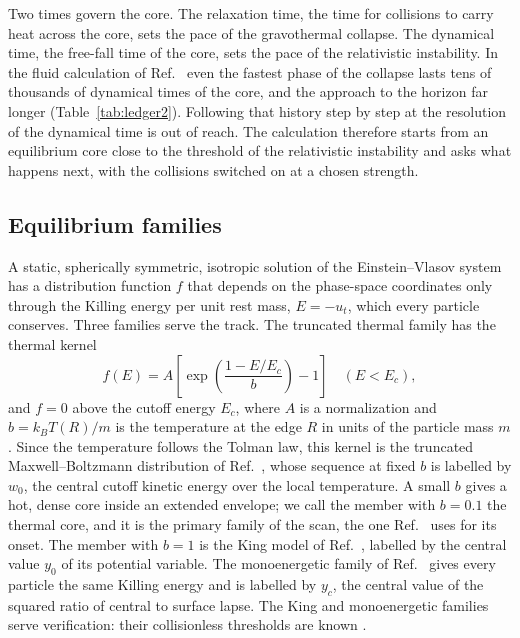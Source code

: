 \documentclass[aps,prd,twocolumn,10pt,superscriptaddress,nofootinbib,longbibliography,floatfix]{revtex4-2}
\begin{document}
Two times govern the core. The relaxation time, the time for collisions to carry heat across the core, sets the pace of the gravothermal collapse. The dynamical time, the free-fall time of the core, sets the pace of the relativistic instability. In the fluid calculation of Ref.~\cite{Gu:2026sidm} even the fastest phase of the collapse lasts tens of thousands of dynamical times of the core, and the approach to the horizon far longer (Table~\ref{tab:ledger2}). Following that history step by step at the resolution of the dynamical time is out of reach. The calculation therefore starts from an equilibrium core close to the threshold of the relativistic instability and asks what happens next, with the collisions switched on at a chosen strength.

\subsection{Equilibrium families}\label{sec:families}

A static, spherically symmetric, isotropic solution of the Einstein--Vlasov system has a distribution function $f$ that depends on the phase-space coordinates only through the Killing energy per unit rest mass, $E=-u_t$, which every particle conserves. Three families serve the track. The truncated thermal family has the thermal kernel
\begin{equation}\label{eq:kernel}
f(E)=A\left[\exp\!\left(\frac{1-E/E_c}{b}\right)-1\right]\quad (E<E_c),
\end{equation}
and $f=0$ above the cutoff energy $E_c$, where $A$ is a normalization and $b=k_BT(R)/m$ is the temperature at the edge $R$ in units of the particle mass $m$. Since the temperature follows the Tolman law, this kernel is the truncated Maxwell--Boltzmann distribution of Ref.~\cite{Feng:2021instab}, whose sequence at fixed $b$ is labelled by $w_0$, the central cutoff kinetic energy over the local temperature. A small $b$ gives a hot, dense core inside an extended envelope; we call the member with $b=0.1$ the thermal core, and it is the primary family of the scan, the one Ref.~\cite{Gu:2026sidm} uses for its onset. The member with $b=1$ is the King model of Ref.~\cite{Gunther:2020ev}, labelled by the central value $y_0$ of its potential variable. The monoenergetic family of Ref.~\cite{Wu:2026nrpic} gives every particle the same Killing energy and is labelled by $y_c$, the central value of the squared ratio of central to surface lapse. The King and monoenergetic families serve verification: their collisionless thresholds are known \cite{Gunther:2020ev,Wu:2026nrpic}.
\end{document}
